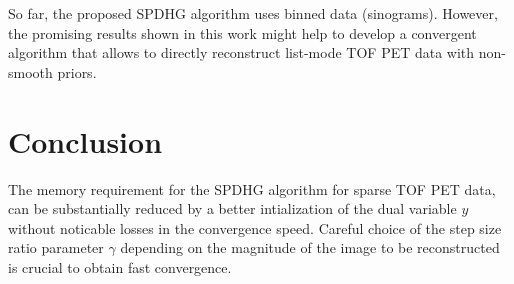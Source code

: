 \documentclass[11pt,twocolumn,twoside]{article}
\begin{document}
So far, the proposed SPDHG algorithm uses binned data (sinograms).
However, the promising results shown in this work might help to develop a convergent
algorithm that allows to directly reconstruct list-mode TOF PET data with non-smooth
priors.

\section{Conclusion}

The memory requirement for the SPDHG algorithm for sparse TOF PET data, can be
substantially reduced by a better intialization of the dual variable $y$ without
noticable losses in the convergence speed.
Careful choice of the step size ratio parameter $\gamma$ depending on the magnitude
of the image to be reconstructed is crucial to obtain fast convergence.

\printbibliography
\end{document}
